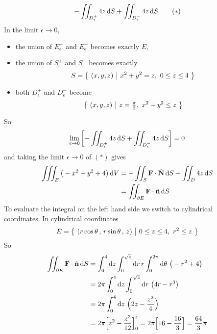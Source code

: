 \begin{solution}
\begin{align*}
           - \iint_{D_\epsilon^+} 4z\,\mathrm{d}S
           + \iint_{D_\epsilon^-} 4z\,\mathrm{d}S
\tag{$*$}\end{align*}
In the limit $\epsilon\rightarrow 0$,
\begin{itemize}\itemsep1pt \parskip0pt  %
\item
the union of $E_\epsilon^+$ and $E_\epsilon^-$ becomes exactly $E$,
\item
the union of $S_\epsilon^+$ and $S_\epsilon^-$ becomes exactly 
\begin{equation*}
S=\big\{ \ (x,y,z)\ \big|\ x^2+y^2 = z,\ 0\le z\le 4\ \big\}
\end{equation*}
\item
both $D_\epsilon^+$ and $D_\epsilon^-$ become
\begin{equation*}
   \Set{(x,y,z)}{z=\tfrac{\pi}{2},\ x^2+y^2\le z}
\end{equation*} 
\end{itemize}
So
\begin{equation*}
   \lim_{\epsilon\rightarrow  0}\left[- \iint_{D_\epsilon^+} 4z\,\mathrm{d}S
           + \iint_{D_\epsilon^-} 4z\,\mathrm{d}S\right] =0
\end{equation*}
and taking the limit $\epsilon\rightarrow 0$ of $(*)$ gives 
\begin{align*}
\iiint_{E} \big(-x^2-y^2+4\big)\,\mathrm{d}V 
&= -\iint_S\mathbf{F}\cdot\hat{\mathbf{N}}\,\mathrm{d}S + \iint_{D}4z\,\mathrm{d}S \\
&= \iint_{\partial E}\mathbf{F}\cdot\hat{\mathbf{n}}\,\mathrm{d}S
\end{align*}
To evaluate the integral on the left hand side we switch to cylindrical coordinates.
In cylindrical coordinates
\begin{equation*}
E=\big\{ \ (r\cos\theta\,,\,r\sin\theta\,,\,z)\ \big|\ 0\le z\le 4,\ r^2\le z\ \big\}
\end{equation*}
So
\begin{align*}
\dblInt_{\partial E}\vF\cdot\hn\,\dee{S}
&=\int_0^4\dee{z}\int_0^{\sqrt{z}}\dee{r}\,r\int_0^{2\pi}\dee{\theta}\ 
         \big(-r^2+4\big) \\
&=2\pi \int_0^4\dee{z}\int_0^{\sqrt{z}}\dee{r}\ \big(4r-r^3\big) \\
&=2\pi \int_0^4\dee{z}\ \Big(2z-\frac{z^2}{4}\Big) \\
&= 2\pi\Big[z^2-\frac{z^3}{12}\Big]_0^4
=2\pi\Big[16-\frac{16}{3}\Big]
=\frac{64}{3}\pi
\end{align*}


\end{solution}
